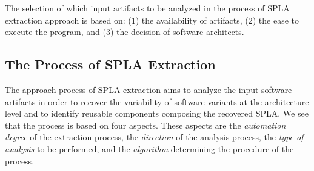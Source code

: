 \documentclass[graybox]{svmult}
\begin{document}
The selection of which input artifacts to be analyzed in the process of SPLA extraction approach is based on: (1) the availability of artifacts, (2) the ease to execute the program, and (3) the decision of software architects.



\subsection{The Process of SPLA Extraction}
The approach process of SPLA extraction aims to analyze the input software artifacts in order to recover the variability of software variants at the architecture level and to identify reusable components composing the recovered SPLA. We see that the process is based on four aspects. These aspects are the \textit{automation degree} of the extraction process, the \textit{direction} of the analysis process, the \textit{type of analysis} to be performed, and the \textit{algorithm} determining the procedure of the process. 
\end{document}
